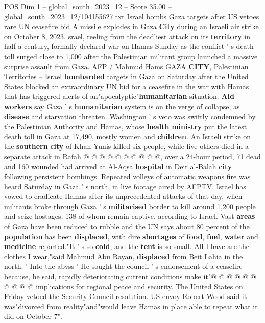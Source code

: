 \begin{textsample}{POS Dim 1 – global\_south\_2023\_12 – Score 35.00 – global\_south\_2023\_12/104155627.txt}  \label{ex:f1_pos_039}
Israel bombs Gaza targets after US vetoes rare UN ceasefire bid A missile explodes in Gaza \textbf{City} during an Israeli air strike on October 8, 2023. srael, reeling from the deadliest attack on its \textbf{territory} in half a century, formally declared war on Hamas Sunday as the conflict ' s death toll surged close to 1,000 after the Palestinian militant group launched a massive surprise assault from Gaza.
AFP / Mahmud Hams GAZA \textbf{CITY}, Palestinian Territories -- Israel \textbf{bombarded} targets in Gaza on Saturday after the United States blocked an extraordinary UN bid for a ceasefire in the war with Hamas that has triggered alerts of an"apocalyptic"\textbf{humanitarian} situation. \textbf{Aid} \textbf{workers} say Gaza ' s \textbf{humanitarian} system is on the verge of collapse, as \textbf{disease} and starvation threaten.
Washington ' s veto was swiftly condemned by the Palestinian Authority and Hamas, whose \textbf{health} \textbf{ministry} put the latest death toll in Gaza at 17,490, mostly women and \textbf{children}.
An Israeli strike on the \textbf{southern} \textbf{city} of Khan Yunis killed six people, while five others died in a separate attack in Rafah @ @ @ @ @ @ @ @ @ @, over a 24-hour period, 71 dead and 160 wounded had arrived at Al-Aqsa \textbf{hospital} in Deir al-Balah \textbf{city} following persistent bombings.
Repeated volleys of automatic weapons fire was heard Saturday in Gaza ' s north, in live footage aired by AFPTV.
Israel has vowed to eradicate Hamas after its unprecedented attacks of that day, when militants broke through Gaza ' s \textbf{militarised} border to kill around 1,200 people and seize hostages, 138 of whom remain captive, according to Israel.
Vast \textbf{areas} of Gaza have been reduced to rubble and the UN says about 80 percent of the \textbf{population} has been \textbf{displaced}, with dire \textbf{shortages} of \textbf{food}, \textbf{fuel}, \textbf{water} and \textbf{medicine} reported."It ' s so \textbf{cold}, and the \textbf{tent} is so small.
All I have are the clothes I wear,"said Mahmud Abu Rayan, \textbf{displaced} from Beit Lahia in the north. ' Into the abyss ' He sought the council ' s endorsement of a ceasefire because, he said, rapidly deteriorating current conditions make it"@ @ @ @ @ @ @ @ @ @ implications for regional peace and security.
The United States on Friday vetoed the Security Council resolution.
US envoy Robert Wood said it was"divorced from reality"and"would leave Hamas in place able to repeat what it did on October 7".

\end{textsample}
